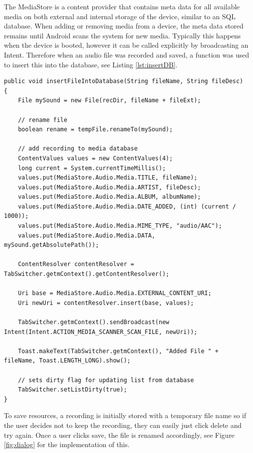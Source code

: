 \documentclass[conference]{acmsiggraph}
\begin{document}
The MediaStore is a content provider that contains meta data for all available media on both external and internal storage of the device, similar to an SQL database. When adding or removing media from a device, the meta data stored remains until Android scans the system for new media. Typically this happens when the device is booted, however it can be called explicitly by broadcasting an Intent. \cite{MediaStore} Therefore when an audio file was recorded and saved, a function was used to insert this into the database, see Listing \ref{lst:insertDB}.


\begin{lstlisting}[label = {lst:insertDB}, caption={Inserting File into MediaStore Database}]
public void insertFileIntoDatabase(String fileName, String fileDesc)
{
    File mySound = new File(recDir, fileName + fileExt);
    	
    // rename file
    boolean rename = tempFile.renameTo(mySound);
    	
   	// add recording to media database
   	ContentValues values = new ContentValues(4);
   	long current = System.currentTimeMillis();
   	values.put(MediaStore.Audio.Media.TITLE, fileName);
   	values.put(MediaStore.Audio.Media.ARTIST, fileDesc);
   	values.put(MediaStore.Audio.Media.ALBUM, albumName);
   	values.put(MediaStore.Audio.Media.DATE_ADDED, (int) (current / 1000));
    values.put(MediaStore.Audio.Media.MIME_TYPE, "audio/AAC");
   	values.put(MediaStore.Audio.Media.DATA, mySound.getAbsolutePath());
    	
   	ContentResolver contentResolver = TabSwitcher.getmContext().getContentResolver();
    	
   	Uri base = MediaStore.Audio.Media.EXTERNAL_CONTENT_URI;
   	Uri newUri = contentResolver.insert(base, values);
    	
   	TabSwitcher.getmContext().sendBroadcast(new Intent(Intent.ACTION_MEDIA_SCANNER_SCAN_FILE, newUri));
   	
   	Toast.makeText(TabSwitcher.getmContext(), "Added File " + fileName, Toast.LENGTH_LONG).show();
    	
   	// sets dirty flag for updating list from database
   	TabSwitcher.setListDirty(true);
}
\end{lstlisting}

To save resources, a recording is initially stored with a temporary file name so if the user decides not to keep the recording, they can easily just click delete and try again. Once a user clicks save, the file is renamed accordingly, see Figure \ref{fig:dialog} for the implementation of this.
\end{document}
